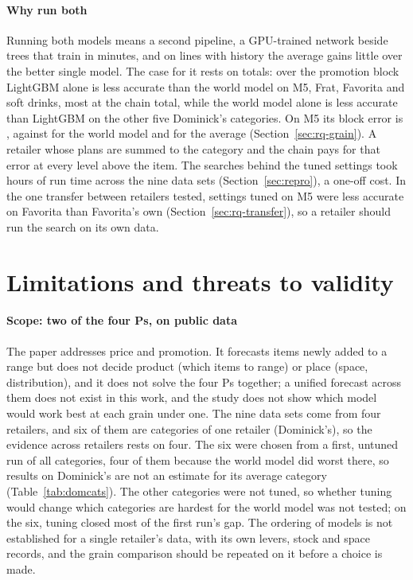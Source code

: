 \paragraph{Why run both}
Running both models means a second pipeline, a GPU-trained network beside trees
that train in minutes, and on lines with history the average gains little over
the better single model. The case for it rests on totals: over the promotion block LightGBM alone is less
accurate than the world model on M5, Frat, Favorita and soft drinks, most at the
chain total, while the world model alone is less accurate than LightGBM on the
other five Dominick's categories.
On M5 its block error is \rqBlockMfiveLgb{}, against \rqBlockMfiveWm{} for the world
model and \rqBlockMfiveAvg{} for the average (Section~\ref{sec:rq-grain}). A retailer
whose plans are summed to the category and the chain pays for that error at every
level above the item.
The searches behind the tuned settings took \computeSearchHours{} hours of run time
across the nine data sets (Section~\ref{sec:repro}), a one-off cost. In the one transfer
between retailers tested, settings tuned on M5 were less accurate on Favorita than Favorita's own
(Section~\ref{sec:rq-transfer}), so a retailer should run the search on its own data.

\section{Limitations and threats to validity}
\label{sec:limits}
\label{sec:limitations}

\paragraph{Scope: two of the four Ps, on public data}
The paper addresses price and promotion. It forecasts items newly added to a
range but does not decide product (which items to range) or place (space,
distribution), and it does not solve the four Ps together; a unified forecast across them does not exist in
this work, and the study does not show which model would work best at each grain
under one. The nine data sets come from four retailers, and six of them are categories of
one retailer (Dominick's), so the evidence across retailers rests on four. The six were chosen from a first,
untuned run of all \domCatN{} categories, four of them because the world model did worst there, so results on
Dominick's are not an estimate for its average category (Table~\ref{tab:domcats}). The other \domCatRest{}
categories were not tuned, so whether tuning would change which categories are hardest for the world model was
not tested; on the six, tuning closed most of the first run's gap. The ordering of models is not established for a single retailer's
data, with its own levers, stock and space records, and the grain comparison
should be repeated on it before a choice is made.

